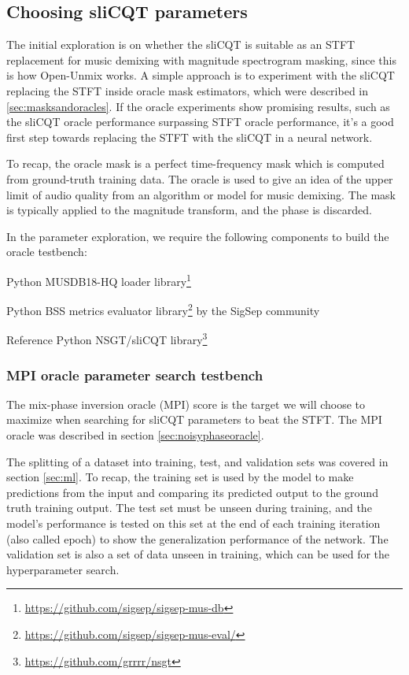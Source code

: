 \documentclass[report.tex]{subfiles}
\begin{document}
\newpagefill

\subsection{Choosing sliCQT parameters}
\label{sec:slicqparamsrch}

The initial exploration is on whether the sliCQT is suitable as an STFT replacement for music demixing with magnitude spectrogram masking, since this is how Open-Unmix works. A simple approach is to experiment with the sliCQT replacing the STFT inside oracle mask estimators, which were described in \ref{sec:masksandoracles}. If the oracle experiments show promising results, such as the sliCQT oracle performance surpassing STFT oracle performance, it's a good first step towards replacing the STFT with the sliCQT in a neural network.

To recap, the oracle mask is a perfect time-frequency mask which is computed from ground-truth training data. The oracle is used to give an idea of the upper limit of audio quality from an algorithm or model for music demixing. The mask is typically applied to the magnitude transform, and the phase is discarded.

In the parameter exploration, we require the following components to build the oracle testbench:

\begin{tight_enumerate}
	\item
		Python MUSDB18-HQ loader library\footnote{\url{https://github.com/sigsep/sigsep-mus-db}}
	\item
		Python BSS metrics evaluator library\footnote{\url{https://github.com/sigsep/sigsep-mus-eval/}} by the SigSep community
	\item
		Reference Python NSGT/sliCQT library\footnote{\url{https://github.com/grrrr/nsgt}}
\end{tight_enumerate}

\subsubsection{MPI oracle parameter search testbench}
\label{sec:mpiparam}

The mix-phase inversion oracle (MPI) score is the target we will choose to maximize when searching for sliCQT parameters to beat the STFT. The MPI oracle was described in section \ref{sec:noisyphaseoracle}.

The splitting of a dataset into training, test, and validation sets was covered in section \ref{sec:ml}. To recap, the training set is used by the model to make predictions from the input and comparing its predicted output to the ground truth training output. The test set must be unseen during training, and the model's performance is tested on this set at the end of each training iteration (also called epoch) to show the generalization performance of the network. The validation set is also a set of data unseen in training, which can be used for the hyperparameter search.
\end{document}
